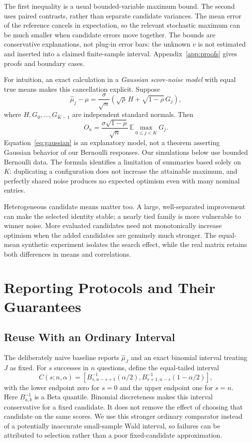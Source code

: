 \documentclass{article}
\newcommand{\E}{\mathbb{E}}
\newcommand{\muh}{\widehat\mu}
\begin{document}
The first inequality is a usual bounded-variable maximum bound. The second uses paired contrasts, rather than separate candidate variances. The mean error of the reference cancels in expectation, so the relevant stochastic maximum can be much smaller when candidate errors move together. The bounds are conservative explanations, not plug-in error bars: the unknown $v$ is not estimated and inserted into a claimed finite-sample interval. Appendix~\ref{app:proofs} gives proofs and boundary cases.

For intuition, an exact calculation in a \emph{Gaussian score-noise model} with equal true means makes this cancellation explicit. Suppose
\begin{equation}
 \muh_j-\mu=\frac{\sigma}{\sqrt n}
  \left(\sqrt\rho\,H+\sqrt{1-\rho}\,G_j\right),
 \label{eq:gaussian}
\end{equation}
where $H,G_0,\ldots,G_{K-1}$ are independent standard normals. Then
\begin{equation}
 O_n=\frac{\sigma\sqrt{1-\rho}}{\sqrt n}\,
       \E\max_{0\leq j<K}G_j.
 \label{eq:gaussoptimism}
\end{equation}
Equation~\eqref{eq:gaussian} is an explanatory model, not a theorem asserting Gaussian behavior of our Bernoulli responses. Our simulations below use bounded Bernoulli data. The formula identifies a limitation of summaries based solely on $K$: duplicating a configuration does not increase the attainable maximum, and perfectly shared noise produces no expected optimism even with many nominal entries.

Heterogeneous candidate means matter too. A large, well-separated improvement can make the selected identity stable; a nearly tied family is more vulnerable to winner noise. More evaluated candidates need not monotonically increase optimism when the added candidates are genuinely much stronger. The equal-mean synthetic experiment isolates the search effect, while the real matrix retains both differences in means and correlations.

\section{Reporting Protocols and Their Guarantees}
\subsection{Reuse With an Ordinary Interval}
The deliberately naive baseline reports $\muh_J$ and an exact binomial interval treating $J$ as fixed. For $s$ successes in $n$ questions, define the equal-tailed interval
\begin{equation}
 C(s;n,\alpha)=[B^{-1}_{s,n-s+1}(\alpha/2),
 B^{-1}_{s+1,n-s}(1-\alpha/2)],
 \label{eq:cp}
\end{equation}
with the lower endpoint zero for $s=0$ and the upper endpoint one for $s=n$. Here $B^{-1}_{a,b}$ is a Beta quantile. Binomial discreteness makes this interval conservative for a fixed candidate. It does not remove the effect of choosing that candidate on the same scores. We use this stronger ordinary comparator instead of a potentially inaccurate small-sample Wald interval, so failures can be attributed to selection rather than a poor fixed-candidate approximation.
\end{document}
